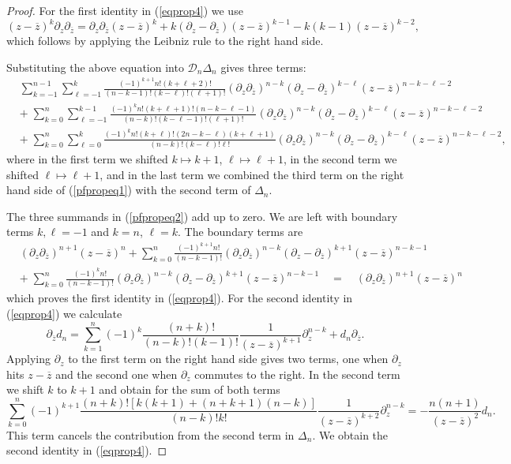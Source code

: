 \documentclass[oneside]{amsart}
\newcommand{\zz}{{\overline{z}}}
\newcommand{\sD}{\mathcal{D}}
\theoremstyle{plain}
\begin{document}
\begin{proof}
For the first identity in (\ref{eqprop4}) we use
\begin{equation}\label{pfpropeq1}
(z-\zz)^k\partial_z\partial_\zz=\partial_z\partial_\zz(z-\zz)^k+k(\partial_z-\partial_\zz)(z-\zz)^{k-1}-k(k-1)(z-\zz)^{k-2},
\end{equation}
which follows by applying the Leibniz rule to the right hand side.

Substituting the above equation into $\sD_n\Delta_n$ gives three terms:
\begin{align}\label{pfpropeq2}
&\sum_{k=-1}^{n-1}\sum_{\ell=-1}^k\frac{(-1)^{k+1}n!(k+\ell+2)!}{(n-k-1)!(k-\ell)!(\ell+1)!}(\partial_z\partial_\zz)^{n-k}(\partial_z-\partial_\zz)^{k-\ell}(z-\zz)^{n-k-\ell-2}\nonumber\\
&+\;\sum_{k=0}^n\sum_{\ell=-1}^{k-1}\frac{(-1)^kn!(k+\ell+1)!(n-k-\ell-1)}{(n-k)!(k-\ell-1)!(\ell+1)!}(\partial_z\partial_\zz)^{n-k}(\partial_z-\partial_\zz)^{k-\ell}(z-\zz)^{n-k-\ell-2}\nonumber\\
&+\;\sum_{k=0}^n\sum_{\ell=0}^k\frac{(-1)^kn!(k+\ell)!(2n-k-\ell)(k+\ell+1)}{(n-k)!(k-\ell)!\ell!}(\partial_z\partial_\zz)^{n-k}(\partial_z-\partial_\zz)^{k-\ell}(z-\zz)^{n-k-\ell-2},
\end{align}
where in the first term we shifted $k\mapsto k+1$, $\ell\mapsto \ell+1$, in the second term we shifted $\ell\mapsto \ell+1$, and in the last term we combined the third term on the right hand
side of (\ref{pfpropeq1}) with the second term of $\Delta_n$.

The three summands in (\ref{pfpropeq2}) add up to zero. We are left with boundary terms $k,\ell=-1$ and $k=n$, $\ell=k$. The boundary terms are
\begin{align*}\label{pfpropeq3}
&(\partial_z\partial_\zz)^{n+1}(z-\zz)^n+\sum_{k=0}^n\frac{(-1)^{k+1}n!}{(n-k-1)!}(\partial_z\partial_\zz)^{n-k}(\partial_z-\partial_\zz)^{k+1}(z-\zz)^{n-k-1}\\
&+\;\sum_{k=0}^n\frac{(-1)^kn!}{(n-k-1)!}(\partial_z\partial_\zz)^{n-k}(\partial_z-\partial_\zz)^{k+1}(z-\zz)^{n-k-1}\quad=\quad(\partial_z\partial_\zz)^{n+1}(z-\zz)^n
\end{align*}
which proves the first identity in (\ref{eqprop4}). For the second identity in (\ref{eqprop4}) we calculate
$$
\partial_\zz d_n=\sum_{k=1}^n(-1)^k\frac{(n+k)!}{(n-k)!(k-1)!}\frac{1}{(z-\zz)^{k+1}}\partial_z^{n-k}+d_n\partial_\zz.
$$
Applying $\partial_z$ to the first term on the right hand side gives two terms, one when $\partial_z$ hits $z-\zz$ and the second one when $\partial_z$ commutes to the right.
In the second term we shift $k$ to $k+1$ and obtain for the sum of both terms
$$
\sum_{k=0}^n(-1)^{k+1}\frac{(n+k)![k(k+1)+(n+k+1)(n-k)]}{(n-k)!k!}\frac{1}{(z-\zz)^{k+2}}\partial_z^{n-k}=-\frac{n(n+1)}{(z-\zz)^2}d_n.
$$
This term cancels the contribution from the second term in $\Delta_n$. We obtain the second identity in (\ref{eqprop4}).
\end{proof}
\end{document}
